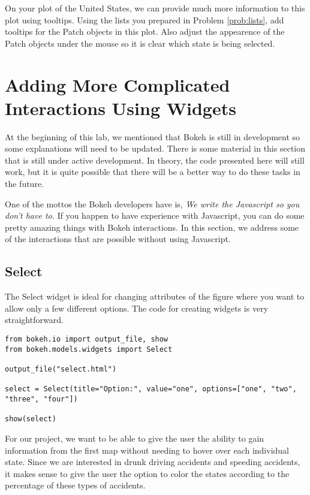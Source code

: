 \begin{problem} 
On your plot of the United States, we can provide much more information to this
plot using tooltips. Using the lists you prepared in Problem \ref{prob:lists},
add tooltips for the Patch objects in this plot. Also adjust the appearence of
the Patch objects under the mouse so it is clear which state is being selected.
\end{problem}

\section*{Adding More Complicated Interactions Using Widgets}
\begin{info}
At the beginning of this lab, we mentioned that Bokeh is still in development
so some explanations will need to be updated. There is some material in this
section that is still under active development. In theory, the code presented
here will still work, but it is quite possible that there will be a better way
to do these tasks in the future.
\end{info}

One of the mottos the Bokeh developers have is, \emph{We write the Javascript so
you don't have to.} If you happen to have experience with Javascript, you can
do some pretty amazing things with Bokeh interactions. In this section, we
address some of the interactions that are possible without using Javascript.

\subsection*{Select}
The Select widget is ideal for changing attributes of the figure where you want
to allow only a few different options. The code for creating widgets is very
straightforward.

\begin{lstlisting}
from bokeh.io import output_file, show
from bokeh.models.widgets import Select

output_file("select.html")

select = Select(title="Option:", value="one", options=["one", "two", "three", "four"])

show(select)
\end{lstlisting}

For our project, we want to be able to
give the user the ability to gain information from the first map without needing
to hover over each individual state. Since we are interested in drunk driving
accidents and speeding accidents, it makes sense to give the user the option to
color the states according to the percentage of these types of accidents.

